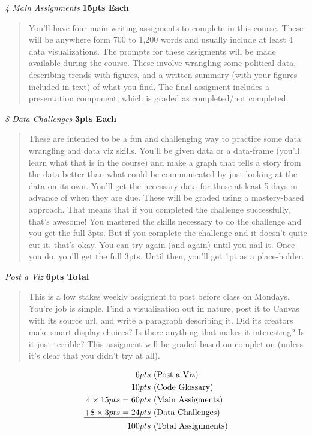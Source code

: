 \documentclass[11pt,]{article}
\begin{document}
\emph{4 Main Assignments} \textbf{15pts Each}

\begin{quote}
You'll have four main writing assigments to complete in this course.
These will be anywhere form 700 to 1,200 words and usually include at
least 4 data visualizations. The prompts for these assigments will be
made available during the course. These involve wrangling some political
data, describing trends with figures, and a written summary (with your
figures included in-text) of what you find. The final assigment includes
a presentation component, which is graded as completed/not completed.
\end{quote}

\emph{8 Data Challenges} \textbf{3pts Each}

\begin{quote}
These are intended to be a fun and challenging way to practice some data
wrangling and data viz skills. You'll be given data or a data-frame
(you'll learn what that is in the course) and make a graph that tells a
story from the data better than what could be communicated by just
looking at the data on its own. You'll get the necessary data for these
at least 5 days in advance of when they are due. These will be graded
using a mastery-based approach. That means that if you completed the
challenge successfully, that's awesome! You mastered the skills
necessary to do the challenge and you get the full 3pts. But if you
complete the challenge and it doesn't quite cut it, that's okay. You can
try again (and again) until you nail it. Once you do, you'll get the
full 3pts. Until then, you'll get 1pt as a place-holder.
\end{quote}

\emph{Post a Viz} \textbf{6pts Total}

\begin{quote}
This is a low stakes weekly assigment to post before class on Mondays.
You're job is simple. Find a visualization out in nature, post it to
Canvas with its source url, and write a paragraph describing it. Did its
creators make smart display choices? Is there anything that makes it
interesting? Is it just terrible? This assigment will be graded based on
completion (unless it's clear that you didn't try at all).
\end{quote}

\[
\begin{aligned}
6pts& \text{ (Post a Viz)} \\
10pts  & \text{ (Code Glossary)} \\
4 \times 15pts = 60pts  & \text{ (Main Assigments)} \\
\underline{+ \space 8 \times 3pts = 24pts} &  \text{ (Data Challenges)} \\
100pts & \text{ (Total Assignments)}
\end{aligned}
\]
\end{document}
